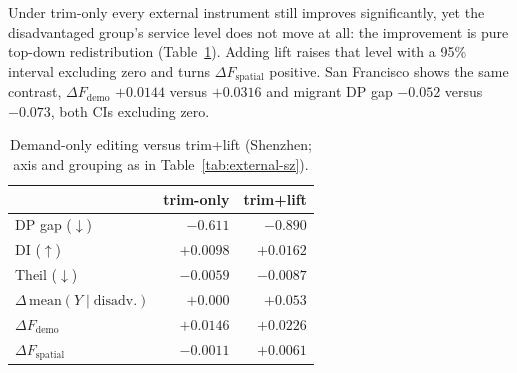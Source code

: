 Under trim-only every external instrument still improves significantly, yet
the disadvantaged group's service level does not move at all: the improvement
is pure top-down redistribution (Table~\ref{tab:ablation}). Adding lift raises
that level with a 95\% interval excluding zero and turns
$\Delta F_{\mathrm{spatial}}$ positive. San Francisco shows the same contrast,
$\Delta F_{\mathrm{demo}}$ $+0.0144$ versus $+0.0316$ and migrant DP gap %
$-0.052$ versus $-0.073$, both CIs excluding zero. %

\begin{table}[!ht]
\centering
\caption{Demand-only editing versus trim+lift (Shenzhen; axis and grouping as in
Table~\ref{tab:external-sz}).}
\label{tab:ablation}
\footnotesize
\setlength{\tabcolsep}{4pt}
\begin{tabular}{lrr}
\toprule
 & trim-only & trim+lift \\
\midrule
DP gap ($\downarrow$) & $-0.611$ & $-0.890$ \\
DI ($\uparrow$) & $+0.0098$ & $+0.0162$ \\
Theil ($\downarrow$) & $-0.0059$ & $-0.0087$ \\
$\Delta\,\mathrm{mean}(Y \mid \mathrm{disadv.})$ & $+0.000$ & $+0.053$ \\
$\Delta F_{\mathrm{demo}}$ & $+0.0146$ & $+0.0226$ \\ %
$\Delta F_{\mathrm{spatial}}$ & $-0.0011$ & $+0.0061$ \\ %
\bottomrule
\end{tabular}
\end{table}

